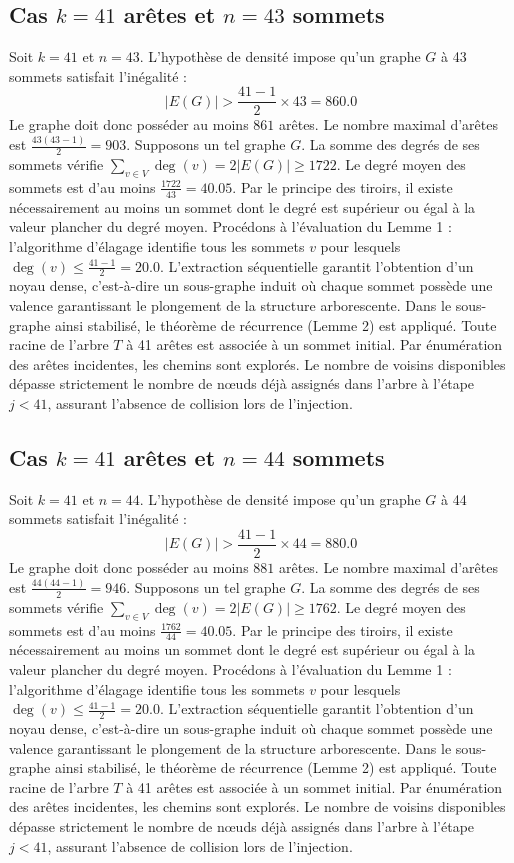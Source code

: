 \documentclass[12pt,a4paper]{article}
\begin{document}
\subsection{Cas $k = 41$ arêtes et $n = 43$ sommets}
Soit $k = 41$ et $n = 43$. L'hypothèse de densité impose qu'un graphe $G$ à 43 sommets satisfait l'inégalité :
$$ |E(G)| > \frac{41-1}{2} \times 43 = 860.0 $$
Le graphe doit donc posséder au moins $861$ arêtes. Le nombre maximal d'arêtes est $\frac{43(43-1)}{2} = 903$.
Supposons un tel graphe $G$. La somme des degrés de ses sommets vérifie $\sum_{v \in V} \deg(v) = 2|E(G)| \geq 1722$.
Le degré moyen des sommets est d'au moins $\frac{1722}{43} = 40.05$.
Par le principe des tiroirs, il existe nécessairement au moins un sommet dont le degré est supérieur ou égal à la valeur plancher du degré moyen.
Procédons à l'évaluation du Lemme 1 : l'algorithme d'élagage identifie tous les sommets $v$ pour lesquels $\deg(v) \leq \frac{41-1}{2} = 20.0$.
L'extraction séquentielle garantit l'obtention d'un noyau dense, c'est-à-dire un sous-graphe induit où chaque sommet possède une valence garantissant le plongement de la structure arborescente.
Dans le sous-graphe ainsi stabilisé, le théorème de récurrence (Lemme 2) est appliqué. Toute racine de l'arbre $T$ à 41 arêtes est associée à un sommet initial. Par énumération des arêtes incidentes, les chemins sont explorés. Le nombre de voisins disponibles dépasse strictement le nombre de nœuds déjà assignés dans l'arbre à l'étape $j < 41$, assurant l'absence de collision lors de l'injection.

\subsection{Cas $k = 41$ arêtes et $n = 44$ sommets}
Soit $k = 41$ et $n = 44$. L'hypothèse de densité impose qu'un graphe $G$ à 44 sommets satisfait l'inégalité :
$$ |E(G)| > \frac{41-1}{2} \times 44 = 880.0 $$
Le graphe doit donc posséder au moins $881$ arêtes. Le nombre maximal d'arêtes est $\frac{44(44-1)}{2} = 946$.
Supposons un tel graphe $G$. La somme des degrés de ses sommets vérifie $\sum_{v \in V} \deg(v) = 2|E(G)| \geq 1762$.
Le degré moyen des sommets est d'au moins $\frac{1762}{44} = 40.05$.
Par le principe des tiroirs, il existe nécessairement au moins un sommet dont le degré est supérieur ou égal à la valeur plancher du degré moyen.
Procédons à l'évaluation du Lemme 1 : l'algorithme d'élagage identifie tous les sommets $v$ pour lesquels $\deg(v) \leq \frac{41-1}{2} = 20.0$.
L'extraction séquentielle garantit l'obtention d'un noyau dense, c'est-à-dire un sous-graphe induit où chaque sommet possède une valence garantissant le plongement de la structure arborescente.
Dans le sous-graphe ainsi stabilisé, le théorème de récurrence (Lemme 2) est appliqué. Toute racine de l'arbre $T$ à 41 arêtes est associée à un sommet initial. Par énumération des arêtes incidentes, les chemins sont explorés. Le nombre de voisins disponibles dépasse strictement le nombre de nœuds déjà assignés dans l'arbre à l'étape $j < 41$, assurant l'absence de collision lors de l'injection.
\end{document}
